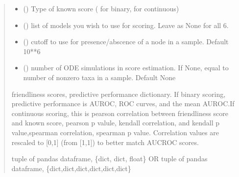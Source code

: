 \documentclass[letterpaper,10pt,english]{sphinxmanual}
\begin{document}
\begin{fulllineitems}
\begin{quote}
\begin{description}
\begin{itemize}
\item {} 
\sphinxAtStartPar
{} () \textendash{} Type of known score ( for binary,  for continuous)

\item {} 
\sphinxAtStartPar
{} () \textendash{} list of models you wish to use for scoring. Leave as None for all 6.

\item {} 
\sphinxAtStartPar
{} () \textendash{} cutoff to use for presence/abscence of a node in a sample. Default 10**\sphinxhyphen{}6

\item {} 
\sphinxAtStartPar
{} () \textendash{} number of ODE simulations in score estimation. If None, equal to number of non\sphinxhyphen{}zero taxa in a sample. Default None

\end{itemize}

\sphinxAtStartPar
friendliness scores, predictive performance dictionary. If binary scoring, predictive performance is AUROC, ROC curves, and the mean AUROC.If continuous scoring, this is pearson correlation between friendliness score and known score, pearson p valule, kendall correlation, and kendall p value,spearman correlation, spearman p value. Correlation values are rescaled to {[}0,1{]} (from {[}\sphinxhyphen{}1,1{]}) to better match AUCROC scores.

\sphinxAtStartPar
tuple of pandas dataframe, \{dict, dict, float\} OR tuple of pandas dataframe, \{dict,dict,dict,dict,dict,dict\}

\end{description}\end{quote}

\end{fulllineitems}

\end{document}
